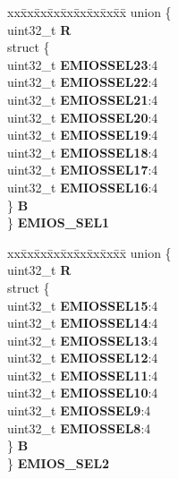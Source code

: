 \begin{DoxyCompactItemize}
\begin{tabbing}
\end{tabbing}\item 
\mbox{\label{structSIU__tag_a457d1fffbac88eb48eec128841a37c8a}} 
\begin{tabbing}
xx\=xx\=xx\=xx\=xx\=xx\=xx\=xx\=xx\=\kill
union \{\\
\>uint32\_t {\bfseries R}\\
\>struct \{\\
\>\>uint32\_t {\bfseries EMIOSSEL23}:4\\
\>\>uint32\_t {\bfseries EMIOSSEL22}:4\\
\>\>uint32\_t {\bfseries EMIOSSEL21}:4\\
\>\>uint32\_t {\bfseries EMIOSSEL20}:4\\
\>\>uint32\_t {\bfseries EMIOSSEL19}:4\\
\>\>uint32\_t {\bfseries EMIOSSEL18}:4\\
\>\>uint32\_t {\bfseries EMIOSSEL17}:4\\
\>\>uint32\_t {\bfseries EMIOSSEL16}:4\\
\>\} {\bfseries B}\\
\} {\bfseries EMIOS\_SEL1}\\

\end{tabbing}\item 
\mbox{\label{structSIU__tag_addf81373222ceba76dd061a8e33f23c3}} 
\begin{tabbing}
xx\=xx\=xx\=xx\=xx\=xx\=xx\=xx\=xx\=\kill
union \{\\
\>uint32\_t {\bfseries R}\\
\>struct \{\\
\>\>uint32\_t {\bfseries EMIOSSEL15}:4\\
\>\>uint32\_t {\bfseries EMIOSSEL14}:4\\
\>\>uint32\_t {\bfseries EMIOSSEL13}:4\\
\>\>uint32\_t {\bfseries EMIOSSEL12}:4\\
\>\>uint32\_t {\bfseries EMIOSSEL11}:4\\
\>\>uint32\_t {\bfseries EMIOSSEL10}:4\\
\>\>uint32\_t {\bfseries EMIOSSEL9}:4\\
\>\>uint32\_t {\bfseries EMIOSSEL8}:4\\
\>\} {\bfseries B}\\
\} {\bfseries EMIOS\_SEL2}\\


\end{tabbing}
\end{DoxyCompactItemize}
